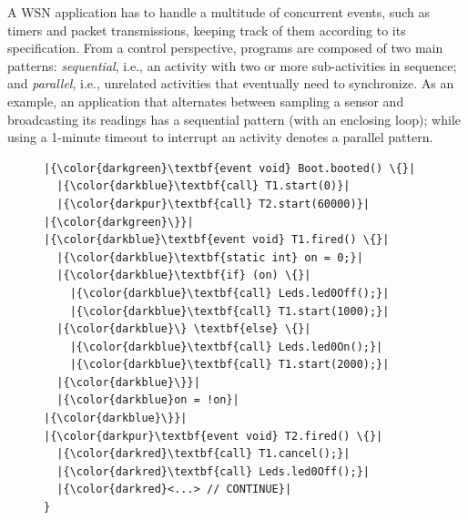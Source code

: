 A WSN application has to handle a multitude of concurrent events, such as 
timers and packet transmissions, keeping track of them according to its 
specification.
%
From a control perspective, programs are composed of two main patterns: 
\emph{sequential}, i.e., an activity with two or more sub-activities in 
sequence;
and \emph{parallel}, i.e., unrelated activities that eventually need to 
synchronize.
%
As an example, an application that alternates between sampling a sensor and 
broadcasting its readings has a sequential pattern (with an enclosing loop); 
while using a 1-minute timeout to interrupt an activity denotes a parallel 
pattern.

\begin{figure}[!t]
\begin{minipage}[t]{0.50\linewidth}
\begin{lstlisting}[title=\emph{/* nesC */}]
|{\color{darkgreen}\textbf{event void} Boot.booted() \{}|
  |{\color{darkblue}\textbf{call} T1.start(0)}|
  |{\color{darkpur}\textbf{call} T2.start(60000)}|
|{\color{darkgreen}\}}|
|{\color{darkblue}\textbf{event void} T1.fired() \{}|
  |{\color{darkblue}\textbf{static int} on = 0;}|
  |{\color{darkblue}\textbf{if} (on) \{}|
    |{\color{darkblue}\textbf{call} Leds.led0Off();}|
    |{\color{darkblue}\textbf{call} T1.start(1000);}|
  |{\color{darkblue}\} \textbf{else} \{}|
    |{\color{darkblue}\textbf{call} Leds.led0On();}|
    |{\color{darkblue}\textbf{call} T1.start(2000);}|
  |{\color{darkblue}\}}|
  |{\color{darkblue}on = !on}|
|{\color{darkblue}\}}|
|{\color{darkpur}\textbf{event void} T2.fired() \{}|
  |{\color{darkred}\textbf{call} T1.cancel();}|
  |{\color{darkred}\textbf{call} Leds.led0Off();}|
  |{\color{darkred}<...> // CONTINUE}|
}


\end{lstlisting}
\end{minipage}
\end{figure}

